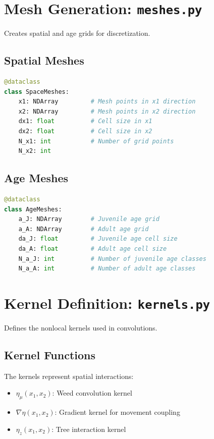 \documentclass[12pt,a4paper]{report}
\begin{document}
\section{Mesh Generation: \texttt{meshes.py}}

Creates spatial and age grids for discretization.

\subsection{Spatial Meshes}

\begin{lstlisting}[language=Python]
@dataclass
class SpaceMeshes:
    x1: NDArray         # Mesh points in x1 direction
    x2: NDArray         # Mesh points in x2 direction
    dx1: float          # Cell size in x1
    dx2: float          # Cell size in x2
    N_x1: int           # Number of grid points
    N_x2: int
\end{lstlisting}

\subsection{Age Meshes}

\begin{lstlisting}[language=Python]
@dataclass
class AgeMeshes:
    a_J: NDArray        # Juvenile age grid
    a_A: NDArray        # Adult age grid
    da_J: float         # Juvenile age cell size
    da_A: float         # Adult age cell size
    N_a_J: int          # Number of juvenile age classes
    N_a_A: int          # Number of adult age classes
\end{lstlisting}

\section{Kernel Definition: \texttt{kernels.py}}

Defines the nonlocal kernels used in convolutions.

\subsection{Kernel Functions}

The kernels represent spatial interactions:

\begin{itemize}
    \item $\eta_\mu(x_1, x_2)$: Weed convolution kernel
    \item $\nabla\eta(x_1, x_2)$: Gradient kernel for movement coupling
    \item $\eta_z(x_1, x_2)$: Tree interaction kernel
\end{itemize}
\end{document}
